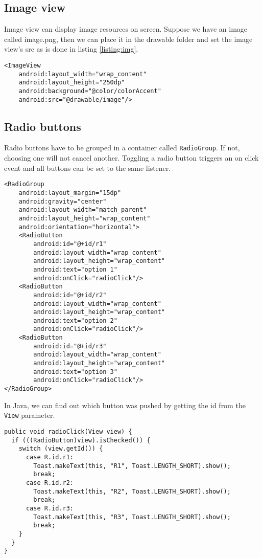 \subsection{Image view}
Image view can display image resources on screen. Suppose we have an image called image.png, then we can place it in the drawable folder and set the image view's src as is done in listing \ref{listing:img}.
\begin{lstlisting}[style=A_XML, caption={Image view declaration}, label={listing:img}]
<ImageView
    android:layout_width="wrap_content"
    android:layout_height="250dp"
    android:background="@color/colorAccent"
    android:src="@drawable/image"/>
\end{lstlisting}

\subsection{Radio buttons}
Radio buttons have to be grouped in a container called \texttt{RadioGroup}. If not, choosing one will not cancel another. Toggling a radio button triggers an on click event and all buttons can be set to the same listener.
\begin{lstlisting}[style=A_XML, caption={Radio button declaration}, label={listing:radiodecl}]
<RadioGroup
    android:layout_margin="15dp"
    android:gravity="center"
    android:layout_width="match_parent"
    android:layout_height="wrap_content"
    android:orientation="horizontal">
    <RadioButton
        android:id="@+id/r1"
        android:layout_width="wrap_content"
        android:layout_height="wrap_content"
        android:text="option 1"
        android:onClick="radioClick"/>
    <RadioButton
        android:id="@+id/r2"
        android:layout_width="wrap_content"
        android:layout_height="wrap_content"
        android:text="option 2"
        android:onClick="radioClick"/>
    <RadioButton
        android:id="@+id/r3"
        android:layout_width="wrap_content"
        android:layout_height="wrap_content"
        android:text="option 3"
        android:onClick="radioClick"/>
</RadioGroup>
\end{lstlisting}

In Java, we can find out which button was pushed by getting the id from the \texttt{View} parameter. 

\begin{lstlisting}[style=A_Java, caption={Radio button event}, label={listing:radioev}]
public void radioClick(View view) {
  if (((RadioButton)view).isChecked()) {
    switch (view.getId()) {
      case R.id.r1:
        Toast.makeText(this, "R1", Toast.LENGTH_SHORT).show();
        break;
      case R.id.r2:
        Toast.makeText(this, "R2", Toast.LENGTH_SHORT).show();
        break;
      case R.id.r3:
        Toast.makeText(this, "R3", Toast.LENGTH_SHORT).show();
        break;
    }
  }
}
\end{lstlisting}

